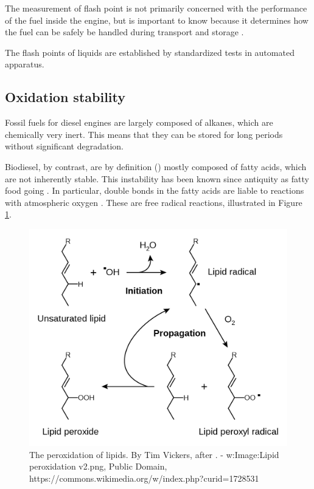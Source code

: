 The measurement of flash point is not primarily concerned with the performance
of the fuel inside the engine, but is important to know because it determines
how the fuel can be safely be handled during transport and storage
\autocite{WFCC2009}.

The flash points of liquids are established by standardized tests in automated
apparatus.

\subsection{Oxidation stability}
\label{sec:Rancimat}

Fossil fuels for diesel engines are largely composed of alkanes, which are
chemically very inert. This means that they can be stored for long periods
without significant degradation.

Biodiesel, by contrast, are by definition (\autocite[Paragraph 4.1.1]{SANS1935})
mostly composed of fatty acids, which are not inherently stable.
This instability has been known since antiquity as fatty food going
. In particular, double bonds in the fatty acids are liable to
reactions with atmospheric oxygen \autocite{Velasco2010}. These are free radical
reactions, illustrated in Figure \ref{fig:RancidRadical}.

\begin{figure}
\centering
\includegraphics[width=\textwidth]{Figures/1281px-Lipid_peroxidation.png}
\decoRule

\caption[The peroxidation of lipids.]{The peroxidation of lipids. By Tim
Vickers, after \autocite{Young2001}. - w:Image:Lipid peroxidation v2.png, Public
Domain, https://commons.wikimedia.org/w/index.php?curid=1728531}

\label{fig:RancidRadical}
\end{figure}


